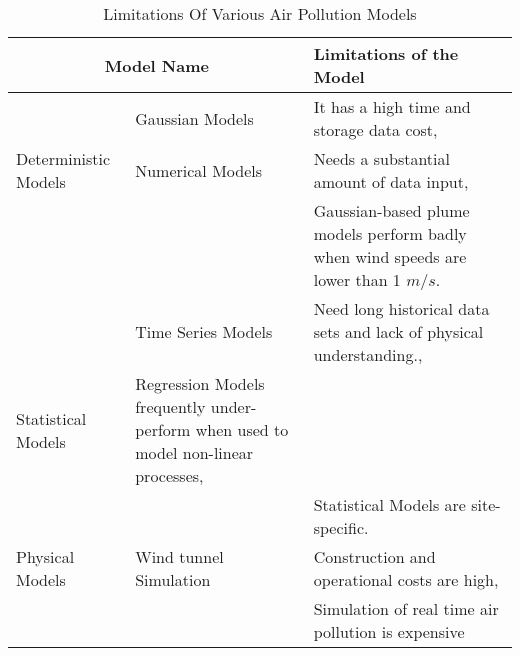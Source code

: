 \begin{table}
	\centering
    \begin{adjustbox}{width=\textwidth}
	\begin{tabular}{|p{4cm}|p{4cm}|p{5cm}|}
		\hline
		\multicolumn{2}{|c|}{\textbf{Model Name}} & \textbf{Limitations of the Model} \\
		\hline
		 & Gaussian Models &  It has a high time and storage data cost,\\
		 Deterministic Models & Numerical Models & Needs a substantial amount of data input, \\ 
		 & & Gaussian-based plume models perform badly when wind speeds are lower than 1 $m/s$. \\
		\hline

		 & Time Series Models &  Need long historical data sets and lack of physical understanding., \\
		Statistical Models & Regression Models frequently under-perform when used to model non-linear processes, \\
		 & & Statistical Models are site-specific. \\
		\hline

		Physical Models & Wind tunnel Simulation & Construction and operational costs are high, \\
		 & & Simulation of real time air pollution is expensive \\
		\hline

	\end{tabular}
	\end{adjustbox}
	\caption{Limitations Of Various Air Pollution Models}
\end{table}

